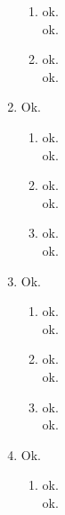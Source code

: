 \documentclass[11pt]{article}
\begin{document}
\begin{enumerate}[label=\arabic*.]
\begin{enumerate}[label=(\alph*)]
\item
ok.
\vspace*{1\baselineskip}
\\
ok.



\item
ok.
\vspace*{1\baselineskip}
\\
ok.



\end{enumerate}



\newpage
\item
Ok.
\begin{enumerate}[label=(\alph*)]
\item
ok.
\vspace*{1\baselineskip}
\\
ok.



\item
ok.
\vspace*{1\baselineskip}
\\
ok.




\item
ok.
\vspace*{1\baselineskip}
\\
ok.



\end{enumerate}



\newpage
\item
Ok.
\begin{enumerate}[label=(\alph*)]
\item
ok.
\vspace*{1\baselineskip}
\\
ok.



\item
ok.
\vspace*{1\baselineskip}
\\
ok.



\item
ok.
\vspace*{1\baselineskip}
\\
ok.
\end{enumerate}



\newpage
\item
Ok.
\begin{enumerate}[label=(\alph*)]
\item
ok.
\vspace*{1\baselineskip}
\\
ok.





\end{enumerate}
\end{enumerate}
\end{document}
